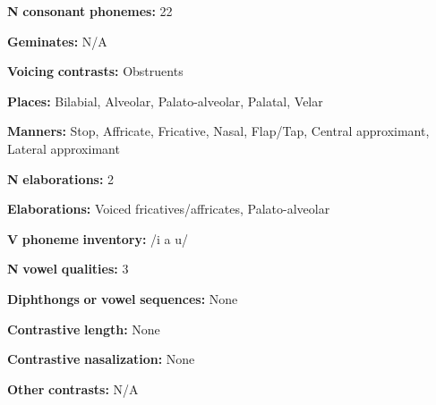 \begin{styleBody}
\textbf{N} \textbf{consonant} \textbf{phonemes:} 22
\end{styleBody}

\begin{styleBody}
\textbf{Geminates:} N/A
\end{styleBody}

\begin{styleBody}
\textbf{Voicing} \textbf{contrasts:} Obstruents
\end{styleBody}

\begin{styleBody}
\textbf{Places:} Bilabial, Alveolar, Palato-alveolar, Palatal, Velar
\end{styleBody}

\begin{styleBody}
\textbf{Manners:} Stop, Affricate, Fricative, Nasal, Flap/Tap, Central approximant, Lateral approximant
\end{styleBody}

\begin{styleBody}
\textbf{N} \textbf{elaborations:} 2
\end{styleBody}

\begin{styleBody}
\textbf{Elaborations:} Voiced fricatives/affricates, Palato-alveolar
\end{styleBody}

\begin{styleBody}
\textbf{V} \textbf{phoneme} \textbf{inventory:} /i a u/
\end{styleBody}

\begin{styleBody}
\textbf{N} \textbf{vowel} \textbf{qualities:} 3
\end{styleBody}

\begin{styleBody}
\textbf{Diphthongs} \textbf{or} \textbf{vowel} \textbf{sequences:} None
\end{styleBody}

\begin{styleBody}
\textbf{Contrastive} \textbf{length:} None
\end{styleBody}

\begin{styleBody}
\textbf{Contrastive} \textbf{nasalization:} None
\end{styleBody}

\begin{styleBody}
\textbf{Other} \textbf{contrasts:} N/A
\end{styleBody}

